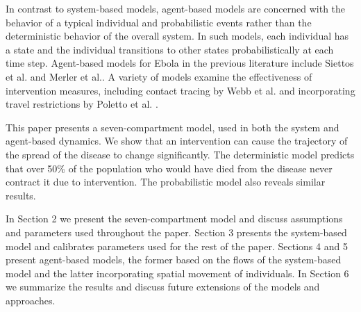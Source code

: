 In contrast to system-based models, agent-based models are concerned with the behavior of a typical individual and probabilistic events rather than the deterministic behavior of the overall system. In such models, each individual has a state and the individual transitions to other states probabilistically at each time step. Agent-based models for Ebola in the previous literature include Siettos et al. \cite{Siettos2015} and Merler et al.\cite{Merler2015}. A variety of models examine the effectiveness of intervention measures, including contact tracing by Webb et al. \cite{Webb2015} and incorporating travel restrictions by Poletto et al. \cite{Poletto2014}.

This paper presents a seven-compartment model, used in both the system and agent-based dynamics. We show that an intervention can cause the trajectory of the spread of the disease to change significantly. The deterministic model predicts that over 50\% of the population who would have died from the disease never contract it due to intervention. The probabilistic model also reveals similar results.

In Section 2 we present the seven-compartment model and discuss assumptions and parameters used throughout the paper. Section 3 presents the system-based model and calibrates parameters used for the rest of the paper. Sections 4 and 5 present agent-based models, the former based on the flows of the system-based model and the latter incorporating spatial movement of individuals. In Section 6 we summarize the results and discuss future extensions of the models and approaches. 

